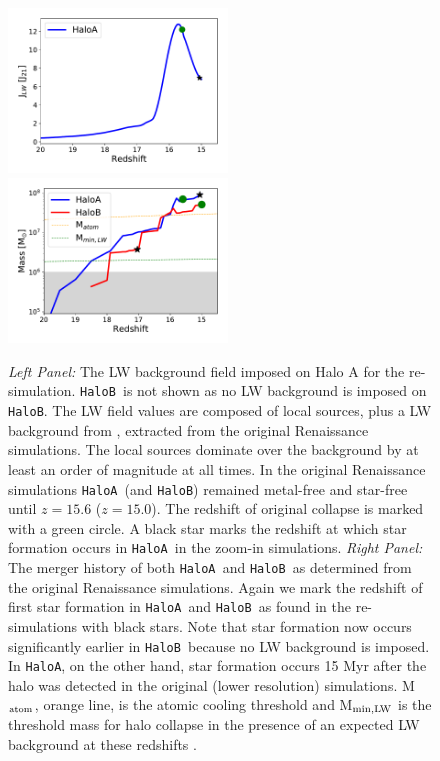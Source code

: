 \documentclass[twocolumn,iop,revtex4]{openjournal}
\newcommand{\ha} {\texttt{HaloA~}}
\newcommand{\hb} {\texttt{HaloB~}}
\newcommand{\hac} {\texttt{HaloA}}
\newcommand{\hbc} {\texttt{HaloB}}
\begin{document}
\begin{figure}
\centering
\begin{minipage}{175mm}      \begin{center} 
\centerline{
\includegraphics[width=0.52\textwidth]{FIGURES/Combined.pdf}
\includegraphics[width=0.52\textwidth]{FIGURES/MassRedshift.pdf}}
\caption{\textit{Left Panel:} The LW background field imposed on Halo A for the re-simulation.
  \hb is not shown as no LW background is imposed on \hbc. The LW field values are composed of local
  sources, plus a LW background from \citet{Wise_2012b}, extracted from the original Renaissance
  simulations. The local sources dominate over the background by at least an order of magnitude at
  all times. In the original Renaissance simulations \ha (and \texttt{HaloB})  remained metal-free
  and star-free until $z = 15.6$ ($z = 15.0$). The redshift of original collapse is marked with a
  green circle. A black star marks the redshift at which star formation occurs in \ha in the
  zoom-in simulations.
  \textit{Right Panel:} The merger history of both \ha and \hb as determined from the original
  Renaissance simulations. Again we mark the redshift of first star formation
  in \ha and \hb as found in the re-simulations with black stars. Note that star formation now
  occurs significantly earlier in \hb because no LW background is imposed. In \hac, on the other
  hand, star formation occurs 15 Myr after the halo was detected in the original (lower resolution)
  simulations. M$_{\rm atom}$, orange line, is the atomic cooling threshold \citep{Fernandez_2014}
  and M$_{\rm min,LW}$ is the threshold mass for halo collapse in the presence of an expected LW
  background at these redshifts \citep{Machacek_2001, OShea_2008}.
  }  \label{Fig:LWHistory}
\end{center} \end{minipage}

\end{figure}
\end{document}
